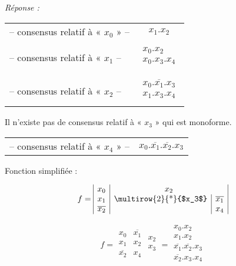 \begin{enumerate} [label=\arabic*$^\circ$]
 
\textsl{Réponse :}

\begin{tabular}{lc}
-- consensus relatif à « $x_0$ » -- &  $ x_1 . x_2 $ \\
 \multicolumn{2}{c}{} \\    
-- consensus relatif à « $x_1$  -- & $ \begin{array}{|c|} 
                                       x_0 . x_2 \\
                                       x_0 . x_3 . x_4 \\
                                    \end{array} $ \\
 \multicolumn{2}{c}{} \\                                   
-- consensus relatif à « $x_2$  -- & $ \begin{array}{|c|} 
									   x_0 . \overline{x_1} . x_3 \\
									   x_1 . x_3 . x_4 \\
                                      \end{array}  $ \\                   
\end{tabular}

Il n'existe pas de consensus relatif à « $x_3$ » qui est monoforme.


\begin{tabular}{lc}
-- consensus relatif à « $x_4$ » -- &  $ x_0 . \overline{x_1} . \overline{x_2} . x_3 $ \\   
 \end{tabular}

\medskip 

Fonction simplifiée : 

\medskip

\[ f = 
\begin{array}{|c|c|c|} 
	 x_0 & \multicolumn{2}{c|}{x_2} \\
	 x_1 &  $\multirow{2}{*}{$x_3$}$ & \overline{x_1} \\
	 \overline{x_2} & & x_4 \\
      \end{array}
\]

\medskip

\[ f= 
\begin{array}{|c|c|}  
	x_0 & \overline{x_1}  \\
	x_1 & x_2 \\
	\overline{x_2} & x_4 \\ 
	\end{array} 
	      \begin{array}{c|} x_2 \\ x_3 \\
	      \end{array}
	  = \begin{array}{|l|} x_0 . x_2 \\
	  x_1 . x_2 \\
	  \overline{x_1} . \overline{x_2} . x_3 \\
	  \overline{x_2} . x_3 . x_4 \\ 
	  \end{array}  
\]


\end{enumerate}
